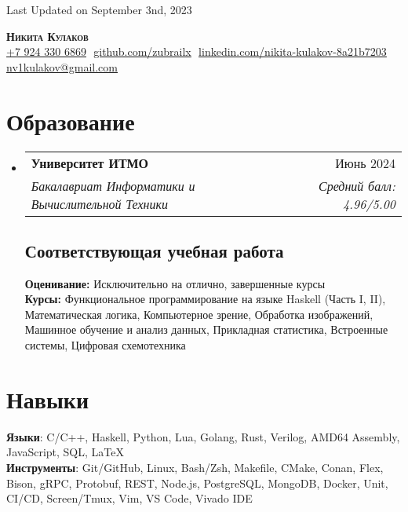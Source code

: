 \documentclass[letterpaper,11pt]{article}
\makeatletter
\newcommand{\resumeSubheading}[4]{
  \vspace{-2pt}\item
    \begin{tabular*}{0.97\textwidth}[t]{l@{\extracolsep{\fill}}r}
      \textbf{#1} & #2 \\
      \textit{\small#3} & \textit{\small #4} \\
    \end{tabular*}\vspace{-7pt}
}
\newcommand{\resumeSubHeadingListStart}{\begin{itemize}[leftmargin=0.15in, label={}]}
\newcommand{\resumeSubHeadingListEnd}{\end{itemize}}
\makeatother
\begin{document}
\begin{flushright}
  \vspace{-4pt}
  \color{gray}
  \item
  Last Updated on September 3nd, 2023
\end{flushright}

\vspace{-7pt}

\begin{center}
    \textbf{\huge \scshape Никита Кулаков} \\ \vspace{8pt}
    \small 
    \href{tel:79243306869}{\underline{+7 924 330 6869}} $  $
    \href{https://github.com/zubrailx}{\underline{github.com/zubrailx}} $  $
    \href{https://www.linkedin.com/in/nikita-kulakov-8a21b7203/}{\underline{linkedin.com/nikita-kulakov-8a21b7203}} $  $
    \href{mailto:nv1kulakov@gmail.com}
    {\underline{nv1kulakov@gmail.com}}
\end{center}

\section{Образование}
  \resumeSubHeadingListStart
  
    \resumeSubheading
      {Университет ИТМО}{Июнь 2024}
      {Бакалавриат Информатики и Вычислительной Техники}{Средний балл: 4.96/5.00}
      
    \subsection{Соответствующая учебная работа}
      \textbf{Оценивание:} Исключительно на отлично, завершенные курсы\\
      \textbf{Курсы:} Функциональное программирование на языке Haskell (Часть I, II), Математическая логика, Компьютерное зрение, Обработка изображений, Машинное обучение и анализ данных, Прикладная статистика, Встроенные системы, Цифровая схемотехника\\

  \resumeSubHeadingListEnd

\section{Навыки}
 \begin{itemize}[leftmargin=0.15in, label={}]
    \small{\item{
    
     \textbf{Языки}{: C/C++, Haskell, Python, Lua, Golang, Rust, Verilog, AMD64 Assembly, JavaScript, SQL, \LaTeX} \\
     
     \textbf{Инструменты}{: Git/GitHub, Linux, Bash/Zsh, Makefile, CMake, Conan, Flex, Bison, gRPC, Protobuf, REST, Node.js, PostgreSQL, MongoDB, Docker, Unit, CI/CD, Screen/Tmux, Vim, VS Code, Vivado IDE}
    }}
 \end{itemize}
\end{document}
